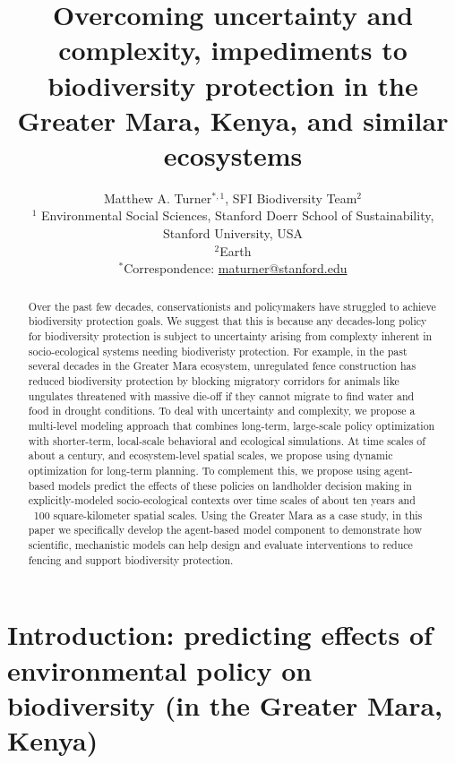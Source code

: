 \documentclass{article}
\begin{document}
\title{Overcoming uncertainty and complexity, impediments to biodiversity protection in
the Greater Mara, Kenya, and similar ecosystems}

\author{Matthew A. Turner$^{*,1}$, SFI Biodiversity Team$^{2}$ \\ 
  {\small $^1$ Environmental Social Sciences, Stanford Doerr School of Sustainability, Stanford University, USA \\ \vspace{0.5em}
$^2$Earth} \\ \vspace{0.5em}
{\small $^*$Correspondence: \href{mailto:maturner@stanford.edu}{maturner@stanford.edu}}}
\maketitle

\begin{abstract}
  \noindent
  Over the past few decades, conservationists and policymakers have struggled
  to achieve biodiversity protection goals.  We suggest that this is because
  any decades-long policy for biodiversity protection is subject to
  uncertainty arising from complexty inherent in socio-ecological systems
  needing biodiveristy protection. For example, in the past several decades in
  the Greater Mara ecosystem, unregulated fence construction has reduced
  biodiversity protection  by blocking migratory corridors for animals like
  ungulates threatened with massive die-off if they cannot migrate to find
  water and food in drought conditions.  To deal with uncertainty and
  complexity, we propose a multi-level modeling approach that combines
  long-term, large-scale policy optimization with shorter-term, local-scale
  behavioral and ecological simulations.  At time scales of about a century,
  and ecosystem-level spatial scales, we propose using dynamic optimization
  for long-term planning. To complement this, we propose using agent-based
  models predict the effects of these policies on landholder decision making
  in explicitly-modeled socio-ecological contexts over time scales of about
  ten years and ~100 square-kilometer spatial scales. Using the Greater Mara
  as a case study, in this paper we specifically develop the agent-based 
  model component to demonstrate how scientific, mechanistic models can help
  design and evaluate interventions to reduce fencing and support biodiversity
  protection.
\end{abstract}


\section{Introduction: predicting effects of environmental policy on 
  biodiversity (in the Greater Mara, Kenya)}
\end{document}
